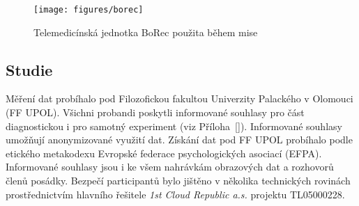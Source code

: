 \begin{figure}[h]
    \begin{center}
        \texttt{[image: figures/borec]}
        \caption{Telemedicínská jednotka BoRec použita během mise}
        \label{fig:borec}
    \end{center}
\end{figure}

\subsection{Studie}
\label{subsec:studie}
Měření dat probíhalo pod Filozofickou fakultou Univerzity Palackého v Olomouci
(\gls{FF UPOL}). Všichni probandi poskytli informované souhlasy pro část
diagnostickou i pro samotný experiment (viz Příloha~\ref{}). Informované
souhlasy umožňují anonymizované využití dat. Získání dat pod FF UPOL probíhalo
podle etického metakodexu Evropské federace psychologických asociací
(\gls{EFPA}). Informované souhlasy jsou i ke všem nahrávkám obrazových dat a
rozhovorů členů posádky. Bezpečí participantů bylo jištěno v několika
technických rovinách prostřednictvím hlavního řešitele \textit{1st Cloud
Republic a.s.} projektu TL05000228.